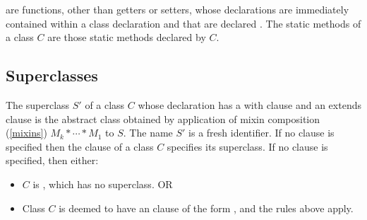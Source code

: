 \documentclass[makeidx]{article}
\begin{document}
\LMHash{}%
are functions, other than getters or setters,
whose declarations are immediately contained within a class declaration
and that are declared \STATIC.
The static methods of a class $C$ are those static methods declared by $C$.




\subsection{Superclasses}


\LMHash{}%
The superclass $S'$ of a class $C$ whose declaration has a with clause
and an extends clause
is the abstract class obtained by application of
mixin composition (\ref{mixins}) $M_k* \cdots * M_1$ to $S$.
The name $S'$ is a fresh identifier.
If no \WITH{} clause is specified then the \EXTENDS{} clause of
a class $C$ specifies its superclass.
If no \EXTENDS{} clause is specified, then either:
\begin{itemize}
\item $C$ is , which has no superclass. OR
\item Class $C$ is deemed to have an \EXTENDS{} clause of the form
  , and the rules above apply.
\end{itemize}
\end{document}
